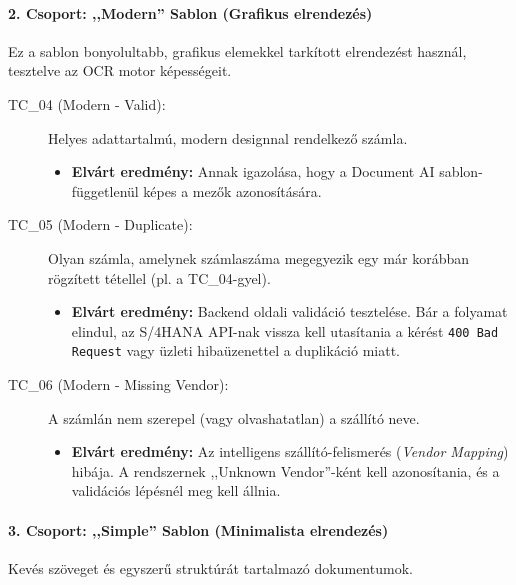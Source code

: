 \paragraph{2. Csoport: ,,Modern'' Sablon (Grafikus elrendezés)}
Ez a sablon bonyolultabb, grafikus elemekkel tarkított elrendezést használ, tesztelve az OCR motor képességeit.

\begin{description}
    \item[TC\_04 (Modern - Valid):] Helyes adattartalmú, modern designnal rendelkező számla.
    \begin{itemize}
        \item \textbf{Elvárt eredmény:} Annak igazolása, hogy a Document AI sablon-függetlenül képes a mezők azonosítására.
    \end{itemize}
    
    \item[TC\_05 (Modern - Duplicate):] Olyan számla, amelynek számlaszáma megegyezik egy már korábban rögzített tétellel (pl. a TC\_04-gyel).
    \begin{itemize}
        \item \textbf{Elvárt eredmény:} Backend oldali validáció tesztelése. Bár a folyamat elindul, az S/4HANA API-nak vissza kell utasítania a kérést \texttt{400 Bad Request} vagy üzleti hibaüzenettel a duplikáció miatt.
    \end{itemize}
    
    \item[TC\_06 (Modern - Missing Vendor):] A számlán nem szerepel (vagy olvashatatlan) a szállító neve.
    \begin{itemize}
        \item \textbf{Elvárt eredmény:} Az intelligens szállító-felismerés (\textit{Vendor Mapping}) hibája. A rendszernek ,,Unknown Vendor''-ként kell azonosítania, és a validációs lépésnél meg kell állnia.
    \end{itemize}
\end{description}

\paragraph{3. Csoport: ,,Simple'' Sablon (Minimalista elrendezés)}
Kevés szöveget és egyszerű struktúrát tartalmazó dokumentumok.

